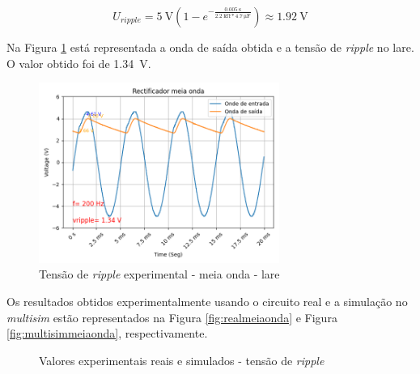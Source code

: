 \begin{equation} \label{eq:vripplecalculado}
	U_{ripple} = \SI{5}{\volt}(1-e^{-\frac{\SI{0.005}{\second}}{\SI{2.2}{\kilo\ohm}*\SI{4.7}{\micro\farad}}}) \approx \SI{1.92}{\volt}
\end{equation}

Na Figura \ref{fig:ripplelaremeiaonda} está representada a onda de saída obtida e a tensão de \textit{ripple} no \acrshort{lare}. O valor obtido foi de \SI{1.34}{\volt}.

\begin{figure}[hbtp]
	\centering
	\includegraphics[width=0.7\textwidth]{figures/resultados_LaRE_meia_onda.png}
	\caption{Tensão de \textit{ripple} experimental - meia onda - \acrshort{lare}}
	\label{fig:ripplelaremeiaonda}
\end{figure}

Os resultados obtidos experimentalmente usando o circuito real e a simulação no \textit{multisim} estão representados na Figura \ref{fig:realmeiaonda} e Figura \ref{fig:multisimmeiaonda}, respectivamente.

\begin{figure}[hbtp]
	\centering%
		\centering
		\qquad
		\caption{Valores experimentais reais e simulados - tensão de \textit{ripple}}%
		\label{fig:simulacaoripple}%
	\end{figure}

